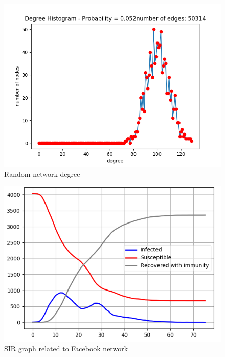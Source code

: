    \begin{figure}[t]
        \centering
        \includegraphics[width=\linewidth]{Figure/Degree_Histogram_Random.png}
        \caption{Random network degree}
        \label{fig:RandomDegree}
    \end{figure}
    
    \begin{figure}[t]
        \centering
        \includegraphics[width=\linewidth]{Figure/SIR_graph_Facebook.png}
        \caption{SIR graph related to Facebook network}
        \label{fig:FacebookSIR}
    \end{figure}
    
